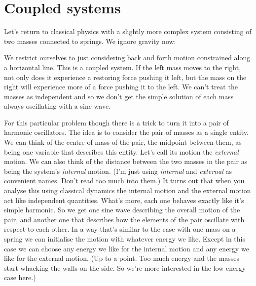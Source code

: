 \documentclass[a4paper]{article}
\begin{document}
\section{Coupled systems}

Let's return to classical physics with a slightly more complex system consisting of two masses connected to springs. We ignore gravity now:

\begin{center}
\end{center}

We restrict ourselves to just considering back and forth motion constrained along a horizontal line.
This is a coupled system.
If the left mass moves to the right, not only does it experience a restoring force pushing it left, but the mass on the right will experience more of a force pushing it to the left.
We can't treat the masses as independent and so we don't get the simple solution of each mass always oscillating with a sine wave.

For this particular problem though there is a trick to turn it into a pair of harmonic oscillators.
The idea is to consider the pair of masses as a single entity.
We can think of the centre of mass of the pair, the midpoint between them, as being one variable that describes this entity.
Let's call its motion the {\em external} motion.
We can also think of the distance between the two masses in the pair as being the system's {\em internal} motion.
(I'm just using {\em internal} and {\em external} as convenient names. Don't read too much into them.)
It turns out that when you analyse this using classical dynamics the internal motion and the external motion act like independent quantities.
What's more, each one behaves exactly like it's simple harmonic.
So we get one sine wave describing the overall motion of the pair, and another one that describes how the elements of the pair oscillate with respect to each other.
In a way that's similar to the case with one mass on a spring we can initialise the motion with whatever energy we like.
Except in this case we can choose any energy we like for the internal motion and any energy we like for the external motion.
(Up to a point.
Too much energy and the masses start whacking the walls on the side.
So we're more interested in the low energy case here.)
\end{document}
